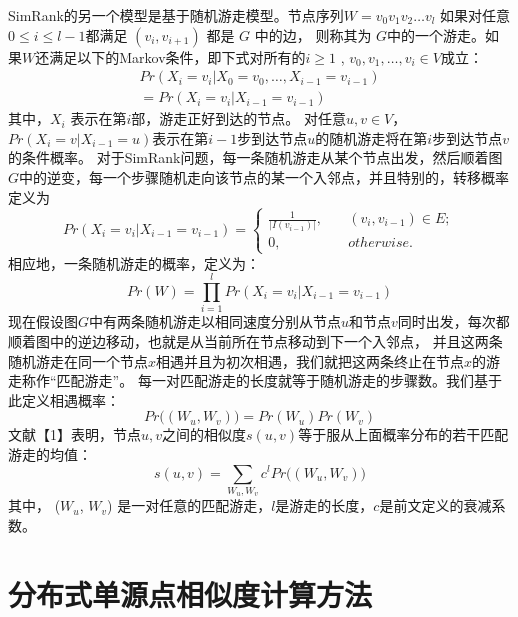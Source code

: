 \documentclass[master]{njuthesis}
\begin{document}
SimRank的另一个模型是基于随机游走模型。节点序列$W=v_0v_1v_2\dots v_l$ 如果对任意$0 \leq i \leq l-1$都满足 $(v_i, v_{i+1})$ 都是 $G$ 中的边，
则称其为 $G$中的一个游走。如果$W$还满足以下的Markov条件，即下式对所有的$i \geq1$ ,   $v_0, v_1, \dots, v_i \in V$成立：
\begin{eqnarray}
\label{eq:three}
  Pr(X_i = v_i|X_{0} = v_{0},\dots, X_{i-1}  = v_{i-1}) \nonumber \\  
 =  Pr(X_i = v_i|X_{i-1} = v_{i-1})
\end{eqnarray}
其中，$X_i$ 表示在第$i$部，游走正好到达的节点。
对任意$ u,v \in V$， $Pr(X_i=v|X_{i-1}=u)$表示在第$i-1$步到达节点$u$的随机游走将在第$i$步到达节点$v$的条件概率。
对于SimRank问题，每一条随机游走从某个节点出发，然后顺着图$G$中的逆变，每一个步骤随机走向该节点的某一个入邻点，并且特别的，转移概率定义为
\begin{equation}
Pr(X_i=v_i|X_{i-1}=v_{i-1}) = \left\{
        \begin{array}{ll}
	\frac{1}{|I(v_{i-1})|}, & \quad (v_i, v_{i-1}) \in E; \\
	0,  &\quad otherwise.
        \end{array}
    \right.
	\label{eq:four}
\end{equation}
相应地，一条随机游走的概率，定义为：
 \begin{equation}
Pr(W) = \prod_{i=1}^{l}Pr(X_i=v_i|X_{i-1}=v_{i-1})
	\label{eq:seven}
\end{equation}
现在假设图$G$中有两条随机游走以相同速度分别从节点$u$和节点$v$同时出发，每次都顺着图中的逆边移动，也就是从当前所在节点移动到下一个入邻点，
并且这两条随机游走在同一个节点$x$相遇并且为初次相遇，我们就把这两条终止在节点$x$的游走称作“匹配游走”。
每一对匹配游走的长度就等于随机游走的步骤数。我们基于此定义相遇概率：
 \begin{equation}
Pr\big((W_u, W_v)\big) = Pr(W_u)Pr(W_v)
	\label{eq:five}
\end{equation}
文献【1】表明，节点$u,v$之间的相似度$s(u,v)$等于服从上面概率分布的若干匹配游走的均值：
 \begin{equation}
s(u,v) = \sum\limits_{W_u, W_v} c^lPr\big((W_u, W_v)\big)
	\label{eq:six}
\end{equation}
其中， ($W_u$, $W_v$) 是一对任意的匹配游走，$l$是游走的长度，$c$是前文定义的衰减系数。

\chapter{分布式单源点相似度计算方法}\label{chapter_sssSimRank}
\end{document}
